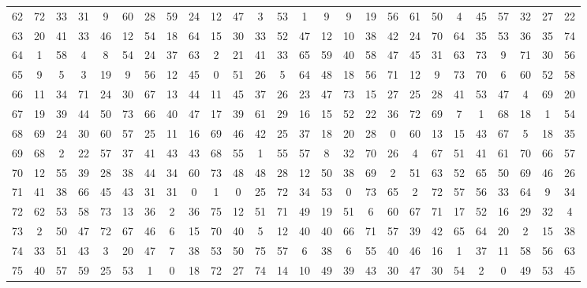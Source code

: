 \begin{table}
\begin{tabular}{c c c c c c c c c c c c c c c c c c c c c c c c c c }
62 & 72 & 33 & 31 & 9 & 60 & 28 & 59 & 24 & 12 & 47 & 3 & 53 & 1 & 9 & 9 & 19 & 56 & 61 & 50 & 4 & 45 & 57 & 32 & 27 & 22 \\
63 & 20 & 41 & 33 & 46 & 12 & 54 & 18 & 64 & 15 & 30 & 33 & 52 & 47 & 12 & 10 & 38 & 42 & 24 & 70 & 64 & 35 & 53 & 36 & 35 & 74 \\
64 & 1 & 58 & 4 & 8 & 54 & 24 & 37 & 63 & 2 & 21 & 41 & 33 & 65 & 59 & 40 & 58 & 47 & 45 & 31 & 63 & 73 & 9 & 71 & 30 & 56 \\
65 & 9 & 5 & 3 & 19 & 9 & 56 & 12 & 45 & 0 & 51 & 26 & 5 & 64 & 48 & 18 & 56 & 71 & 12 & 9 & 73 & 70 & 6 & 60 & 52 & 58 \\
66 & 11 & 34 & 71 & 24 & 30 & 67 & 13 & 44 & 11 & 45 & 37 & 26 & 23 & 47 & 73 & 15 & 27 & 25 & 28 & 41 & 53 & 47 & 4 & 69 & 20 \\
67 & 19 & 39 & 44 & 50 & 73 & 66 & 40 & 47 & 17 & 39 & 61 & 29 & 16 & 15 & 52 & 22 & 36 & 72 & 69 & 7 & 1 & 68 & 18 & 1 & 54 \\
68 & 69 & 24 & 30 & 60 & 57 & 25 & 11 & 16 & 69 & 46 & 42 & 25 & 37 & 18 & 20 & 28 & 0 & 60 & 13 & 15 & 43 & 67 & 5 & 18 & 35 \\
69 & 68 & 2 & 22 & 57 & 37 & 41 & 43 & 43 & 68 & 55 & 1 & 55 & 57 & 8 & 32 & 70 & 26 & 4 & 67 & 51 & 41 & 61 & 70 & 66 & 57 \\
70 & 12 & 55 & 39 & 28 & 38 & 44 & 34 & 60 & 73 & 48 & 48 & 28 & 12 & 50 & 38 & 69 & 2 & 51 & 63 & 52 & 65 & 50 & 69 & 46 & 26 \\
71 & 41 & 38 & 66 & 45 & 43 & 31 & 31 & 0 & 1 & 0 & 25 & 72 & 34 & 53 & 0 & 73 & 65 & 2 & 72 & 57 & 56 & 33 & 64 & 9 & 34 \\
72 & 62 & 53 & 58 & 73 & 13 & 36 & 2 & 36 & 75 & 12 & 51 & 71 & 49 & 19 & 51 & 6 & 60 & 67 & 71 & 17 & 52 & 16 & 29 & 32 & 4 \\
73 & 2 & 50 & 47 & 72 & 67 & 46 & 6 & 15 & 70 & 40 & 5 & 12 & 40 & 40 & 66 & 71 & 57 & 39 & 42 & 65 & 64 & 20 & 2 & 15 & 38 \\
74 & 33 & 51 & 43 & 3 & 20 & 47 & 7 & 38 & 53 & 50 & 75 & 57 & 6 & 38 & 6 & 55 & 40 & 46 & 16 & 1 & 37 & 11 & 58 & 56 & 63 \\
75 & 40 & 57 & 59 & 25 & 53 & 1 & 0 & 18 & 72 & 27 & 74 & 14 & 10 & 49 & 39 & 43 & 30 & 47 & 30 & 54 & 2 & 0 & 49 & 53 & 45 \\
\hline
\end{tabular}
\end{table}